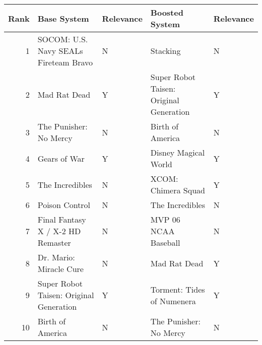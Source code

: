 \begin{tabular}{rllll}
\toprule
 Rank &                             Base System & Relevance &                          Boosted System & Relevance \\
\midrule
    1 &   SOCOM: U.S. Navy SEALs Fireteam Bravo &         N &                                Stacking &         N \\
    2 &                            Mad Rat Dead &         Y & Super Robot Taisen: Original Generation &         Y \\
    3 &                  The Punisher: No Mercy &         N &                        Birth of America &         N \\
    4 &                            Gears of War &         Y &                    Disney Magical World &         Y \\
    5 &                         The Incredibles &         N &                     XCOM: Chimera Squad &         Y \\
    6 &                          Poison Control &         N &                         The Incredibles &         N \\
    7 &       Final Fantasy X / X-2 HD Remaster &         N &                    MVP 06 NCAA Baseball &         N \\
    8 &                 Dr. Mario: Miracle Cure &         N &                            Mad Rat Dead &         Y \\
    9 & Super Robot Taisen: Original Generation &         Y &              Torment: Tides of Numenera &         Y \\
   10 &                        Birth of America &         N &                  The Punisher: No Mercy &         N \\
\bottomrule
\end{tabular}
